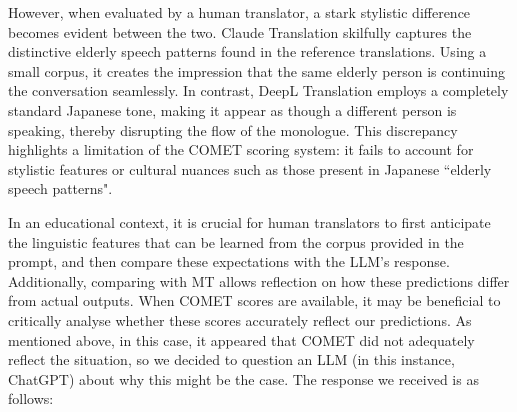 \documentclass[output=paper,colorlinks,citecolor=brown, japanesefont]{langscibook}
\begin{document}
However, when evaluated by a human translator, a stark stylistic difference becomes evident between the two. Claude Translation skilfully captures the distinctive elderly speech patterns found in the reference translations. Using a small corpus, it creates the impression that the same elderly person is continuing the conversation seamlessly. In contrast, DeepL Translation employs a completely standard Japanese tone, making it appear as though a different person is speaking, thereby disrupting the flow of the monologue. This discrepancy highlights a limitation of the COMET scoring system: it fails to account for stylistic features or cultural nuances such as those present in Japanese ``elderly speech patterns".

In an educational context, it is crucial for human translators to first anticipate the linguistic features that can be learned from the corpus provided in the prompt, and then compare these expectations with the LLM's response. Additionally, comparing with MT allows reflection on how these predictions differ from actual outputs. When COMET scores are available, it may be beneficial to critically analyse whether these scores accurately reflect our predictions. As mentioned above, in this case, it appeared that COMET did not adequately reflect the situation, so we decided to question an LLM (in this instance, ChatGPT) about why this might be the case. The response we received is as follows:

\end{document}
